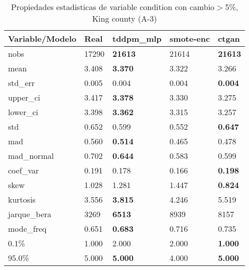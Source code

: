 \begin{table}[H]
\centering
\fontsize{8}{14}\selectfont
\caption{Propiedades estadisticas de variable condition con cambio\ensuremath{>}5\%, King county (A-3)}
\label{table-stats-king county-a-3-condition-short}
\begin{tabular}{|l|m{10em}|m{10em}|m{10em}|m{10em}|}
\hline
 \rowcolor[gray]{0.8}
Variable/Modelo & Real & tddpm\_mlp & smote-enc & ctgan \\
\hline nobs & 17290 & \bfseries 21613 & \cellcolor[rgb]{0.9, 0.54, 0.52} 21614 & \bfseries 21613 \\
\hline mean & 3.408 & \bfseries 3.370 & 3.322 & \cellcolor[rgb]{0.9, 0.54, 0.52} 3.266 \\
\hline std\_err & 0.005 & 0.004 & \cellcolor[rgb]{0.9, 0.54, 0.52} 0.004 & \bfseries 0.004 \\
\hline upper\_ci & 3.417 & \bfseries 3.378 & 3.330 & \cellcolor[rgb]{0.9, 0.54, 0.52} 3.275 \\
\hline lower\_ci & 3.398 & \bfseries 3.362 & 3.315 & \cellcolor[rgb]{0.9, 0.54, 0.52} 3.257 \\
\hline std & 0.652 & 0.599 & \cellcolor[rgb]{0.9, 0.54, 0.52} 0.552 & \bfseries 0.647 \\
\hline mad & 0.560 & \bfseries 0.514 & \cellcolor[rgb]{0.9, 0.54, 0.52} 0.465 & 0.478 \\
\hline mad\_normal & 0.702 & \bfseries 0.644 & \cellcolor[rgb]{0.9, 0.54, 0.52} 0.583 & 0.599 \\
\hline coef\_var & 0.191 & 0.178 & \cellcolor[rgb]{0.9, 0.54, 0.52} 0.166 & \bfseries 0.198 \\
\hline skew & 1.028 & 1.281 & \cellcolor[rgb]{0.9, 0.54, 0.52} 1.447 & \bfseries 0.824 \\
\hline kurtosis & 3.556 & \bfseries 3.815 & 4.246 & \cellcolor[rgb]{0.9, 0.54, 0.52} 5.519 \\
\hline jarque\_bera & 3269 & \bfseries 6513 & \cellcolor[rgb]{0.9, 0.54, 0.52} 8939 & 8157 \\
\hline mode\_freq & 0.651 & \bfseries 0.683 & 0.716 & \cellcolor[rgb]{0.9, 0.54, 0.52} 0.735 \\
\hline 0.1\% & 1.000 & \cellcolor[rgb]{0.9, 0.54, 0.52} 2.000 & \cellcolor[rgb]{0.9, 0.54, 0.52} 2.000 & \bfseries 1.000 \\
\hline 95.0\% & 5.000 & \bfseries 5.000 & \cellcolor[rgb]{0.9, 0.54, 0.52} 4.000 & \bfseries 5.000 \\
\hline
\end{tabular}
\end{table}
